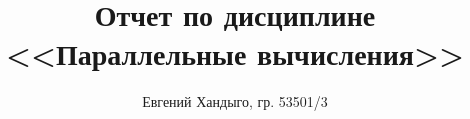 \documentclass[12pt]{article}
\begin{document}
\title{Отчет по дисциплине \\ <<Параллельные вычисления>>} 
\author{Евгений Хандыго, гр. 53501/3}

\maketitle
\tableofcontents

\newpage






\end{document}
